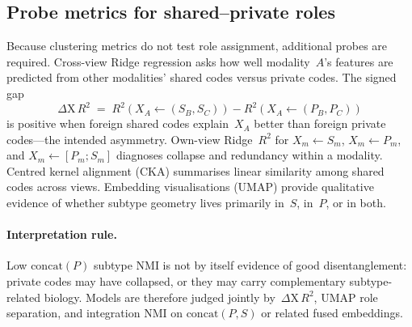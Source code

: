 \subsection{Probe metrics for shared--private roles}

Because clustering metrics do not test role assignment, additional probes are required. Cross-view Ridge regression asks how well modality~$A$'s features are predicted from other modalities' shared codes versus private codes. The signed gap
\begin{equation}
\Delta\mathrm{X}\,R^{2}
\;=\;
R^{2}\!\left(X_A\leftarrow (S_B,S_C)\right)
-
R^{2}\!\left(X_A\leftarrow (P_B,P_C)\right)
\end{equation}
is positive when foreign shared codes explain~$X_A$ better than foreign private codes---the intended asymmetry. Own-view Ridge~$R^{2}$ for $X_m\leftarrow S_m$, $X_m\leftarrow P_m$, and $X_m\leftarrow[P_m;S_m]$ diagnoses collapse and redundancy within a modality. Centred kernel alignment (CKA) summarises linear similarity among shared codes across views. Embedding visualisations (UMAP) provide qualitative evidence of whether subtype geometry lives primarily in~$S$, in~$P$, or in both.

\paragraph{Interpretation rule.}
Low $\mathrm{concat}(P)$ subtype NMI is not by itself evidence of good disentanglement: private codes may have collapsed, or they may carry complementary subtype-related biology. Models are therefore judged jointly by~$\Delta\mathrm{X}\,R^{2}$, UMAP role separation, and integration NMI on $\mathrm{concat}(P,S)$ or related fused embeddings.
